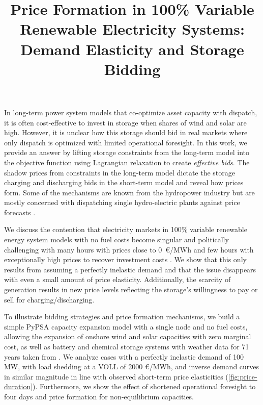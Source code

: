 \documentclass[final,3p]{elsarticle}
\begin{document}
\begin{frontmatter}

\title{Price Formation in 100\% Variable Renewable Electricity Systems:\\Demand Elasticity and Storage Bidding}
\end{frontmatter}

In long-term power system models that co-optimize asset capacity with dispatch,
it is often cost-effective to invest in storage when shares of wind and solar
are high. However, it is unclear how this storage should bid in real markets
where only dispatch is optimized with limited operational foresight. In this
work, we provide an answer by lifting storage constraints from the long-term
model into the objective function using Lagrangian relaxation to create
\textit{effective bids}. The shadow prices from constraints in the long-term
model dictate the storage charging and discharging bids in the short-term model
and reveal how prices form. Some of the mechanisms are known from the hydropower
industry but are mostly concerned with dispatching single hydro-electric plants
against price forecasts
\cite{lederer1984overall,Pereira1989,Rotting1992,Fosso1999,CRAMPES2019100746}.

We discuss the contention that electricity markets in 100\% variable renewable
energy system models with no fuel costs become singular and politically
challenging with many hours with prices close to 0~\euro/MWh and few hours with
exceptionally high prices to recover investment costs
\cite{mallapragadaElectricityPricing2023,jungePropertiesDeeply2022,levinEnergyStorage2023,taylorPowerSystems2015}.
We show that this only results from assuming a perfectly inelastic demand and
that the issue disappears with even a small amount of price elasticity.
Additionally, the scarcity of generation results in new price levels reflecting
the storage's willingness to pay or sell for charging/discharging.

To illustrate bidding strategies and price formation mechanisms, we build a
simple PyPSA \cite{PyPSA} capacity expansion model with a single node and no
fuel costs, allowing the expansion of onshore wind and solar capacities with
zero marginal cost, as well as battery and chemical storage systems with weather
data for 71 years taken from \cite{rdgdr321}. We analyze cases with a perfectly
inelastic demand of 100 MW, with load shedding at a VOLL of 2000 \euro/MWh, and
inverse demand curves in similar magnitude in line with observed short-term
price elasticities \cite{hirthHowAggregate2023,RePEc:zbw:esprep:272048}
(\cref{fig:price-duration}). Furthermore, we show the effect of shortened
operational foresight to four days and price formation for non-equilibrium
capacities.
\end{document}
